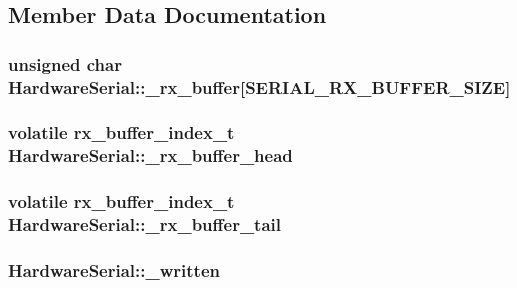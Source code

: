 \subsection{Member Data Documentation}
\hypertarget{classHardwareSerial_a3e915f174853e1acdfbacaea53f14d09}{
\subsubsection[{\-\_\-rx\-\_\-buffer}]{\setlength{\rightskip}{0pt plus 5cm}unsigned char Hardware\-Serial\-::\-\_\-rx\-\_\-buffer\mbox{[}{\bf S\-E\-R\-I\-A\-L\-\_\-\-R\-X\-\_\-\-B\-U\-F\-F\-E\-R\-\_\-\-S\-I\-Z\-E}\mbox{]}\hspace{0.3cm}{\ttfamily [protected]}}}\label{classHardwareSerial_a3e915f174853e1acdfbacaea53f14d09}
\hypertarget{classHardwareSerial_ac6fe1f875521caeb248fa9b477338ff3}{
\subsubsection[{\-\_\-rx\-\_\-buffer\-\_\-head}]{\setlength{\rightskip}{0pt plus 5cm}volatile {\bf rx\-\_\-buffer\-\_\-index\-\_\-t} Hardware\-Serial\-::\-\_\-rx\-\_\-buffer\-\_\-head\hspace{0.3cm}{\ttfamily [protected]}}}\label{classHardwareSerial_ac6fe1f875521caeb248fa9b477338ff3}
\hypertarget{classHardwareSerial_a891eab42df821ab76c2a273e0a78195e}{
\subsubsection[{\-\_\-rx\-\_\-buffer\-\_\-tail}]{\setlength{\rightskip}{0pt plus 5cm}volatile {\bf rx\-\_\-buffer\-\_\-index\-\_\-t} Hardware\-Serial\-::\-\_\-rx\-\_\-buffer\-\_\-tail\hspace{0.3cm}{\ttfamily [protected]}}}\label{classHardwareSerial_a891eab42df821ab76c2a273e0a78195e}
\hypertarget{classHardwareSerial_af8b285e1c8ce2e9a0b83c59c5cfd574b}{
\subsubsection[{\-\_\-written}]{ Hardware\-Serial\-::\-\_\-written\hspace{0.3cm}{\ttfamily [protected]}}}\label{classHardwareSerial_af8b285e1c8ce2e9a0b83c59c5cfd574b}


